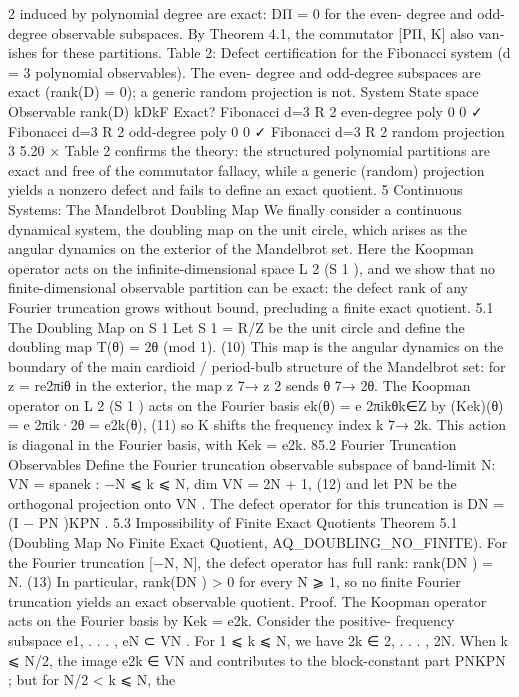 2
induced by polynomial degree are exact: DΠ = 0 for the even-
degree and odd-degree observable subspaces. By Theorem 4.1, the commutator [PΠ, K] also van-
ishes for these partitions.
Table 2: Defect certification for the Fibonacci system (d = 3 polynomial observables). The even-
degree and odd-degree subspaces are exact (rank(D) = 0); a generic random projection is not.
System State space Observable rank(D) kDkF Exact?
Fibonacci d=3 R
2
even-degree poly 0 0 ✓
Fibonacci d=3 R
2 odd-degree poly 0 0 ✓
Fibonacci d=3 R
2
random projection 3 5.20 ×
Table 2 confirms the theory: the structured polynomial partitions are exact and free of the
commutator fallacy, while a generic (random) projection yields a nonzero defect and fails to define
an exact quotient.
5 Continuous Systems: The Mandelbrot Doubling Map
We finally consider a continuous dynamical system, the doubling map on the unit circle, which
arises as the angular dynamics on the exterior of the Mandelbrot set. Here the Koopman operator
acts on the infinite-dimensional space L
2
(S
1
), and we show that no finite-dimensional observable
partition can be exact: the defect rank of any Fourier truncation grows without bound, precluding
a finite exact quotient.
5.1 The Doubling Map on S
1
Let S
1 = R/Z be the unit circle and define the doubling map
T(θ) = 2θ (mod 1). (10)
This map is the angular dynamics on the boundary of the main cardioid / period-bulb structure of
the Mandelbrot set: for z = re2πiθ in the exterior, the map z 7→ z
2
sends θ 7→ 2θ. The Koopman
operator on L
2
(S
1
) acts on the Fourier basis {ek(θ) = e
2πikθ}k∈Z by
(Kek)(θ) = e
2πik·2θ = e2k(θ), (11)
so K shifts the frequency index k 7→ 2k. This action is diagonal in the Fourier basis, with Kek = e2k.
85.2 Fourier Truncation Observables
Define the Fourier truncation observable subspace of band-limit N:
VN = span{ek : −N ⩽ k ⩽ N}, dim VN = 2N + 1, (12)
and let PN be the orthogonal projection onto VN . The defect operator for this truncation is
DN = (I − PN )KPN .
5.3 Impossibility of Finite Exact Quotients
Theorem 5.1 (Doubling Map No Finite Exact Quotient, AQ_DOUBLING_NO_FINITE). For
the Fourier truncation [−N, N], the defect operator has full rank:
rank(DN ) = N. (13)
In particular, rank(DN ) > 0 for every N ⩾ 1, so no finite Fourier truncation yields an exact
observable quotient.
Proof. The Koopman operator acts on the Fourier basis by Kek = e2k. Consider the positive-
frequency subspace {e1, . . . , eN } ⊂ VN . For 1 ⩽ k ⩽ N, we have 2k ∈ {2, . . . , 2N}. When k ⩽ N/2,
the image e2k ∈ VN and contributes to the block-constant part PNKPN ; but for N/2 < k ⩽ N, the
